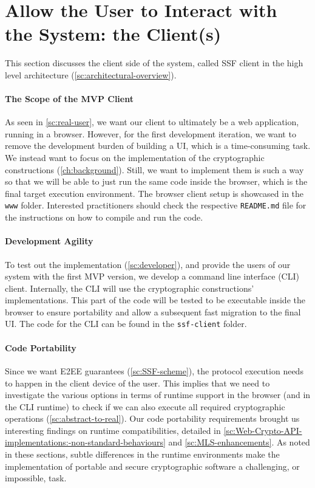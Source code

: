 \section{Allow the User to Interact with the System: the Client(s)}\label{sc:client-overview}

This section discusses the client side of the system,
called SSF client in the high level architecture (\cref{sc:architectural-overview}).

\paragraph{The Scope of the MVP Client}
As seen in \cref{sc:real-user}, 
we want our client to ultimately be a web application,
running in a browser.
However, for the first development iteration, we want to
remove the development burden of building a UI, which is
a time-consuming task. We instead want to focus on the
implementation of the cryptographic constructions (\cref{ch:background}). 
Still, we want to implement them is such a way so that we
will be able to just run the same code inside the browser,
which is the final target execution environment.
The browser client setup is showcased
in the \texttt{www} folder. Interested practitioners
should check the respective \texttt{README.md} file
for the instructions on how to compile and run the code.

\paragraph{Development Agility} 
To test out the implementation (\cref{sc:developer}), 
and provide the users of our system
with the first MVP version, we develop a
command line interface (CLI) client.
Internally, the CLI will use the cryptographic constructions'
implementations. This part of the code will be tested to be executable
inside the browser to ensure portability and allow a subsequent fast
migration to the final UI. The code for the CLI
can be found in the \texttt{ssf-client} folder.

\paragraph{Code Portability}
Since we want E2EE guarantees (\cref{sc:SSF-scheme}), the protocol execution needs to happen
in the client device of the user.
This implies that we need to investigate the various options
in terms of runtime support in the browser (and in the CLI runtime) 
to check if we can also execute all required cryptographic 
operations (\cref{sc:abstract-to-real}).
Our code portability requirements brought us interesting findings on runtime compatibilities, detailed in \cref{sc:Web-Crypto-API-implementations:-non-standard-behaviours}
and \cref{sc:MLS-enhancements}. As noted in these sections,
subtle differences in the runtime environments
make the implementation of portable and secure 
cryptographic software a challenging, or impossible, 
task.

